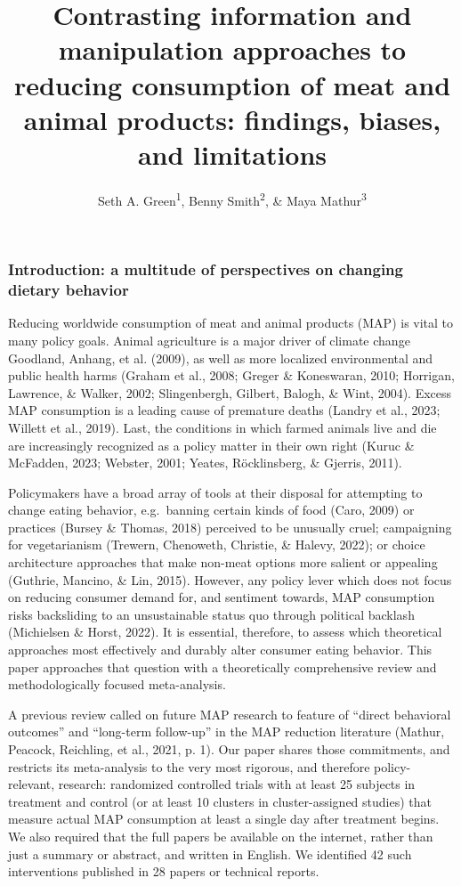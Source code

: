\documentclass[
  man]{apa6}
\title{Contrasting information and manipulation approaches to reducing consumption of meat and animal products: findings, biases, and limitations}
\author{Seth A. Green\textsuperscript{1}, Benny Smith\textsuperscript{2}, \& Maya Mathur\textsuperscript{3}}
\date{}
\affiliation{\vspace{0.5cm}\textsuperscript{1} Kahneman-Treisman Center, Princeton University\\\textsuperscript{2} Allied Scholars for Animal Protection\\\textsuperscript{3} Stanford University}
\begin{document}
\maketitle

\subsubsection{Introduction: a multitude of perspectives on changing dietary behavior}\label{introduction-a-multitude-of-perspectives-on-changing-dietary-behavior}

Reducing worldwide consumption of meat and animal products (MAP) is vital to many policy goals. Animal agriculture is a major driver of climate change Goodland, Anhang, et al. (2009), as well as more localized environmental and public health harms (Graham et al., 2008; Greger \& Koneswaran, 2010; Horrigan, Lawrence, \& Walker, 2002; Slingenbergh, Gilbert, Balogh, \& Wint, 2004). Excess MAP consumption is a leading cause of premature deaths (Landry et al., 2023; Willett et al., 2019). Last, the conditions in which farmed animals live and die are increasingly recognized as a policy matter in their own right (Kuruc \& McFadden, 2023; Webster, 2001; Yeates, Röcklinsberg, \& Gjerris, 2011).

Policymakers have a broad array of tools at their disposal for attempting to change eating behavior, e.g.~banning certain kinds of food (Caro, 2009) or practices (Bursey \& Thomas, 2018) perceived to be unusually cruel; campaigning for vegetarianism (Trewern, Chenoweth, Christie, \& Halevy, 2022); or choice architecture approaches that make non-meat options more salient or appealing (Guthrie, Mancino, \& Lin, 2015). However, any policy lever which does not focus on reducing consumer demand for, and sentiment towards, MAP consumption risks backsliding to an unsustainable status quo through political backlash (Michielsen \& Horst, 2022). It is essential, therefore, to assess which theoretical approaches most effectively and durably alter consumer eating behavior. This paper approaches that question with a theoretically comprehensive review and methodologically focused meta-analysis.

A previous review called on future MAP research to feature of ``direct behavioral outcomes'' and ``long-term follow-up'' in the MAP reduction literature (Mathur, Peacock, Reichling, et al., 2021, p. 1). Our paper shares those commitments, and restricts its meta-analysis to the very most rigorous, and therefore policy-relevant, research: randomized controlled trials with at least 25 subjects in treatment and control (or at least 10 clusters in cluster-assigned studies) that measure actual MAP consumption at least a single day after treatment begins. We also required that the full papers be available on the internet, rather than just a summary or abstract, and written in English. We identified 42 such interventions published in 28 papers or technical reports.
\end{document}
